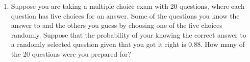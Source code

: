 \documentclass[12pt]{article}
\begin{document}
\begin{enumerate}

\item \label{Ch5_Bayes_F05Ex1_solve_for_n} Suppose you are taking a multiple choice exam with 20 questions, where each question has five choices for an answer. Some of the questions you know the answer to and the others you guess by choosing one of the five choices randomly. Suppose that the probability of your knowing the correct answer to a randomly selected question given that you got it right is 0.88. How many of the 20 questions were you prepared for?







\end{enumerate}
\end{document}
